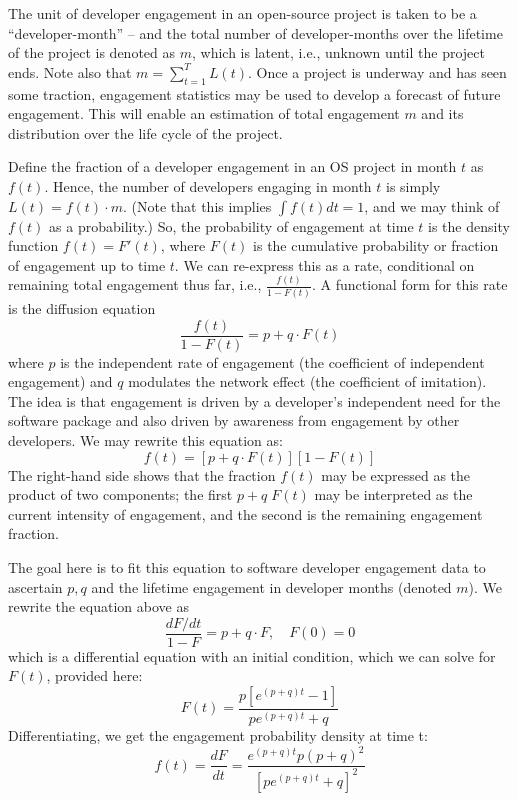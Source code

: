\documentclass[conference]{IEEEtran}
\begin{document}
The unit of developer engagement in an open-source project is taken to be a ``developer-month'' -- and the total number of developer-months over the lifetime of the project is denoted as $m$, which is latent, i.e., unknown until the project ends. Note also that $m = \sum_{t=1}^T L(t)$. Once a project is underway and has seen some traction, engagement statistics may be used to develop a forecast of future engagement. This will enable an estimation of total engagement $m$ and its distribution over the life cycle of the project. 

Define the fraction of a developer engagement in an OS project in month $t$ as $f(t)$. Hence, the number of developers engaging in month $t$ is simply $L(t) = f(t) \cdot m$. (Note that this implies $\int f(t) dt = 1$, and we may think of $f(t)$ as a probability.) So, the probability of engagement at time $t$ is the density function $f(t)=F'(t)$, where $F(t)$ is the cumulative probability or fraction of engagement up to time $t$. We can re-express this as a rate, conditional on remaining total engagement thus far, i.e., $\frac{f(t)}{1-F(t)}$. A functional form for this rate is the diffusion equation
\begin{equation}
\frac{f(t)}{1-F(t)} = p + q \cdot F(t) \label{diffusion}
\end{equation}
where $p$ is the independent rate of engagement (the coefficient of independent engagement) and $q$ modulates the network effect (the coefficient of imitation). The idea is that engagement is driven by a developer’s independent need for the software package and also driven by awareness from engagement by other developers. We may rewrite this equation as:
\begin{equation}
f(t) = [p + q \cdot F(t)][1-F(t)]
\end{equation}
The right-hand side shows that the fraction $f(t)$ may be expressed as the product of two components; the first $p+q\;F(t)$  may be interpreted as the current intensity of engagement, and the second is the remaining engagement fraction.   

The goal here is to fit this equation to software developer engagement data to ascertain $p,q$ and the lifetime engagement in developer months (denoted $m$). We rewrite the equation above as 
\begin{equation}
\frac{dF/dt}{1-F} = p + q \cdot F, \quad F(0)=0
\end{equation}
which is a differential equation with an initial condition, which we can solve for $F(t)$, provided here: 
\begin{equation}
F(t) = \frac{p[e^{(p+q)t}-1]}{p e^{(p+q)t}+q}
\end{equation}
Differentiating, we get the engagement probability density at time t:
\begin{equation}
f(t) = \frac{dF}{dt} = \frac{e^{(p+q)t} p (p+q)^2}{[p e^{(p+q)t}+q]^2} \label{ft}
\end{equation}
\end{document}
